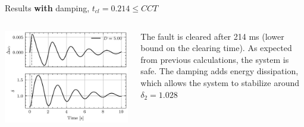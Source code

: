 \begin{frame} {Results \textbf{with} damping, $t_{cl} = 0.214 \leq CCT$}
\begin{columns}
    \begin{column}{0.55\textwidth}
        \begin{center}
        \includegraphics[width=0.9\linewidth]{images/P-dynamics_bis.png}
        \end{center}
    \end{column}
    \begin{column}{0.45\textwidth}
        The fault is cleared after 214 ms (lower bound on the clearing time). As expected from previous calculations, the system is safe. The damping adds energy dissipation, which allows the system to stabilize around $\delta_2 = 1.028$
    \end{column}
\end{columns}
\end{frame}

